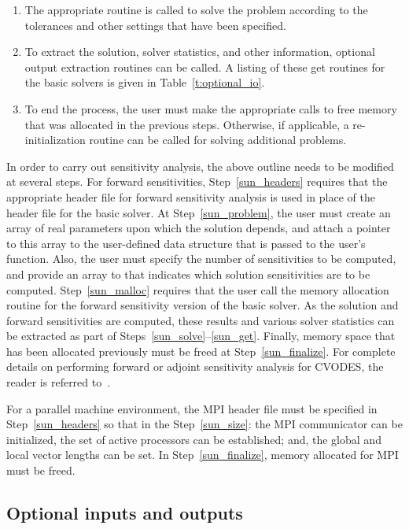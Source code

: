 \begin{enumerate}
\item \label{sun_solve}
The appropriate routine is called to solve the problem according to
the tolerances and other settings that have been specified.

\item \label{sun_get}
To extract the solution, solver statistics, and other information,
optional output extraction routines can be called. A listing of these
get routines for the basic solvers is given in Table~\ref{t:optional_io}.

\item \label{sun_finalize}
To end the process, the user must make the appropriate calls to
free memory that was allocated in the previous steps. Otherwise, if
applicable, a re-initialization routine can be called for solving
additional problems.

\end{enumerate}

In order to carry out sensitivity analysis, the above outline
needs to be modified at several steps. For forward sensitivities,
Step~\ref{sun_headers} requires that the appropriate header
file for forward sensitivity analysis is used in place of the header
file for the basic solver. At Step~\ref{sun_problem}, the user must
create an array of real parameters upon which the solution depends,
and attach a pointer to this array to the user-defined data structure
that is passed to the user's function. Also, the user must specify the
number of sensitivities to be computed, and provide an array to that
indicates which solution sensitivities are to be
computed. Step~\ref{sun_malloc} requires that the user call the memory
allocation routine for the forward sensitivity version of the basic
solver. As the solution and forward sensitivities are computed,
these results and various solver statistics can be extracted as part
of Steps~\ref{sun_solve}--\ref{sun_get}. Finally, memory space that
has been allocated previously must be freed at
Step~\ref{sun_finalize}. For complete details on performing forward or
adjoint sensitivity analysis for CVODES, the reader is referred to~\cite{SeHi:03}.

For a parallel machine environment, the MPI header file must be
specified in Step~\ref{sun_headers} so that in the Step~\ref{sun_size}: the MPI
communicator can be initialized, the set of active processors can be
established; and, the global and local vector lengths can be set.
In Step~\ref{sun_finalize}, memory allocated for MPI must be freed.

\subsection{Optional inputs and outputs}\label{ss:optional_io}

